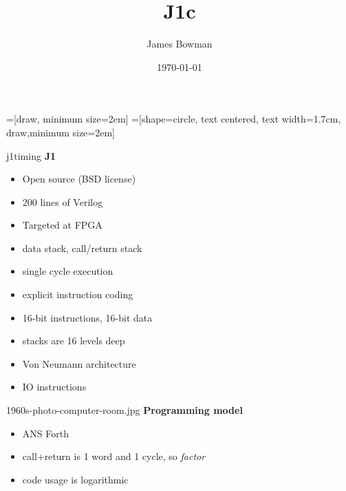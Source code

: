 \documentclass[compress,mathserif]{beamer}
\begin{document}
\title{J1c}   
\author{James Bowman} 
\date{\today} 

\frame{\titlepage} 

=[draw, minimum size=2em]
=[shape=circle, text centered, text width=1.7cm, draw,minimum size=2em]
\everymath{\displaystyle}

\begin{imageframe}{j1timing}
  {\bf\Huge J1}
\end{imageframe}

\begin{frame}
\begin{itemize}
   \item Open source (BSD license)
   \item 200 lines of Verilog
   \item Targeted at FPGA
\end{itemize}
\end{frame}

\begin{frame}
\begin{itemize}
   \item data stack, call/return stack
   \item single cycle execution
   \item explicit instruction coding
\end{itemize}
\end{frame}

\begin{frame}
\begin{itemize}
   \item 16-bit instructions, 16-bit data
   \item stacks are 16 levels deep
   \item Von Neumann architecture
   \item IO instructions
\end{itemize}
\end{frame}

\begin{imageframe}{1960s-photo-computer-room.jpg}
  {\bf\Huge Programming model}
\end{imageframe}

\begin{frame}
\begin{itemize}
   \item ANS Forth
   \item call+return is 1 word and 1 cycle, so \textit{factor}
   \item code usage is logarithmic
\end{itemize}
\end{frame}
\end{document}
